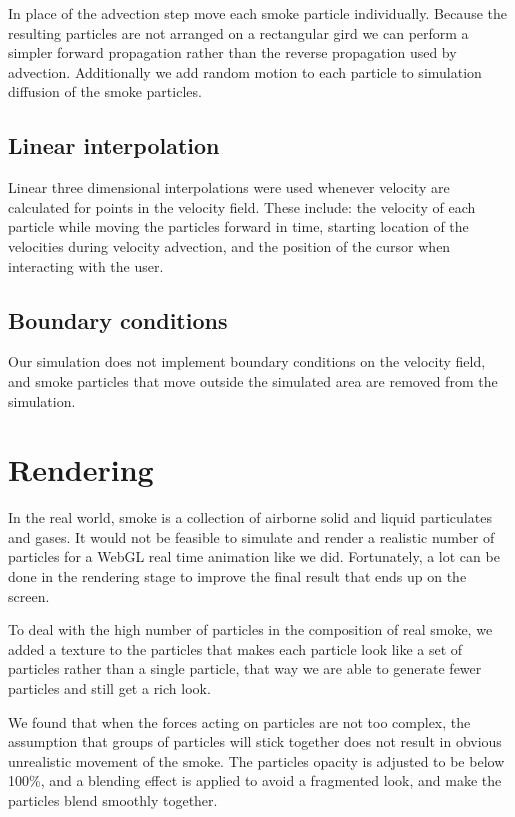 \documentclass[conference]{acmsiggraph}
\begin{document}
In place of the advection step move each smoke particle individually. Because
the resulting particles are not arranged on a rectangular gird we can perform a
simpler forward propagation rather than the reverse propagation used by
advection. Additionally we add random motion to each particle to simulation
diffusion of the smoke particles.

\subsection{Linear interpolation}

Linear three dimensional interpolations were used whenever velocity are
calculated for points in the velocity field. These include: the velocity of each
particle while moving the particles forward in time, starting location of the
velocities during velocity advection, and the position of the cursor when
interacting with the user.

\subsection{Boundary conditions}

Our simulation does not implement boundary conditions on the velocity field, and
smoke particles that move outside the simulated area are removed from the
simulation.

\section{Rendering}

In the real world, smoke is a collection of airborne solid and liquid
particulates and gases. It would not be feasible to simulate and render a
realistic number of particles for a WebGL real time animation like we did.
Fortunately, a lot can be done in the rendering stage to improve the final
result that ends up on the screen.

To deal with the high number of particles in the composition of real smoke, we
added a texture to the particles that makes each particle look like a set of
particles rather than a single particle, that way we are able to generate fewer
particles and still get a rich look. 

We found that when the forces acting on particles are not too complex, the
assumption that groups of particles will stick together does not result in
obvious unrealistic movement of the smoke. The particles opacity is adjusted to
be below 100\%, and a blending effect is applied to avoid a fragmented look, and
make the particles blend smoothly together.
\end{document}
